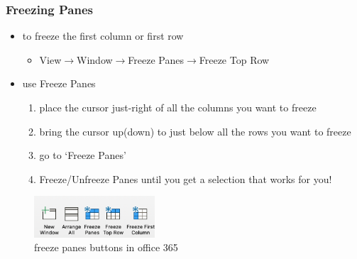 \documentclass[12pt]{beamer}
\begin{document}
	\begin{frame}
		\frametitle{Freezing Panes}
		\begin{itemize}
			\item to freeze the first column or first row
				\begin{itemize}
					\item View$\rightarrow$Window$\rightarrow$Freeze Panes$\rightarrow$Freeze Top Row
				\end{itemize}
			\item use Freeze Panes
			\begin{enumerate}
				\item place the cursor just-right of all the columns you want to freeze
				\item bring the cursor up(down) to just below all the rows you want to freeze
				\item go to `Freeze Panes'
				\item Freeze/Unfreeze Panes until you get a selection that works for you!
			\end{enumerate}
		\end{itemize}
	\begin{figure}	
		\begin{center}
			\includegraphics[width=0.4\textwidth]{freezepanes.png}
		\end{center}	
		\caption{freeze panes buttons in office 365}	
	\end{figure}
\end{frame}
\end{document}
